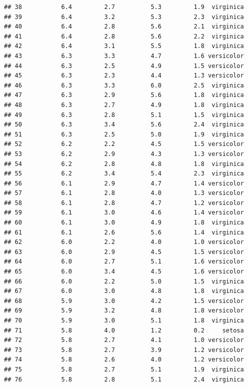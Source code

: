 \documentclass[
]{article}
\begin{document}
\begin{verbatim}
## 38           6.4         2.7          5.3         1.9  virginica
## 39           6.4         3.2          5.3         2.3  virginica
## 40           6.4         2.8          5.6         2.1  virginica
## 41           6.4         2.8          5.6         2.2  virginica
## 42           6.4         3.1          5.5         1.8  virginica
## 43           6.3         3.3          4.7         1.6 versicolor
## 44           6.3         2.5          4.9         1.5 versicolor
## 45           6.3         2.3          4.4         1.3 versicolor
## 46           6.3         3.3          6.0         2.5  virginica
## 47           6.3         2.9          5.6         1.8  virginica
## 48           6.3         2.7          4.9         1.8  virginica
## 49           6.3         2.8          5.1         1.5  virginica
## 50           6.3         3.4          5.6         2.4  virginica
## 51           6.3         2.5          5.0         1.9  virginica
## 52           6.2         2.2          4.5         1.5 versicolor
## 53           6.2         2.9          4.3         1.3 versicolor
## 54           6.2         2.8          4.8         1.8  virginica
## 55           6.2         3.4          5.4         2.3  virginica
## 56           6.1         2.9          4.7         1.4 versicolor
## 57           6.1         2.8          4.0         1.3 versicolor
## 58           6.1         2.8          4.7         1.2 versicolor
## 59           6.1         3.0          4.6         1.4 versicolor
## 60           6.1         3.0          4.9         1.8  virginica
## 61           6.1         2.6          5.6         1.4  virginica
## 62           6.0         2.2          4.0         1.0 versicolor
## 63           6.0         2.9          4.5         1.5 versicolor
## 64           6.0         2.7          5.1         1.6 versicolor
## 65           6.0         3.4          4.5         1.6 versicolor
## 66           6.0         2.2          5.0         1.5  virginica
## 67           6.0         3.0          4.8         1.8  virginica
## 68           5.9         3.0          4.2         1.5 versicolor
## 69           5.9         3.2          4.8         1.8 versicolor
## 70           5.9         3.0          5.1         1.8  virginica
## 71           5.8         4.0          1.2         0.2     setosa
## 72           5.8         2.7          4.1         1.0 versicolor
## 73           5.8         2.7          3.9         1.2 versicolor
## 74           5.8         2.6          4.0         1.2 versicolor
## 75           5.8         2.7          5.1         1.9  virginica
## 76           5.8         2.8          5.1         2.4  virginica

\end{verbatim}
\end{document}
